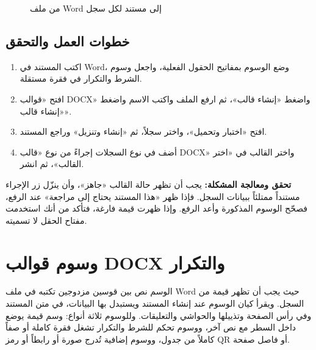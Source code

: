 \begin{figure}[H]
\centering
{}
\rclegend
\caption{من ملف Word إلى مستند لكل سجل}
\label{fig:builder-docx-flow}
\end{figure}

\subsection{خطوات العمل والتحقق}
\begin{enumerate}
\item اكتب المستند في Word، وضع الوسوم بمفاتيح الحقول الفعلية، واجعل وسوم الشرط والتكرار في فقرة مستقلة.
\item افتح «قوالب DOCX» واضغط «إنشاء قالب»، ثم ارفع الملف واكتب الاسم واضغط «إنشاء قالب».
\item افتح «اختبار وتحميل»، واختر سجلاً، ثم «إنشاء وتنزيل» وراجع المستند.
\item أضف في نوع السجلات إجراءً من نوع «قالب DOCX» واختر القالب في «اختر القالب»، ثم انشر.
\end{enumerate}

\textbf{تحقق ومعالجة المشكلة:} يجب أن تظهر حالة القالب «جاهز»، وأن ينزّل زر الإجراء مستنداً ممتلئاً ببيانات السجل. فإذا ظهر «هذا المستند يحتاج إلى مراجعة» عند الرفع، فصحّح الوسوم المذكورة وأعد الرفع. وإذا ظهرت قيمة فارغة، فتأكد من أنك استخدمت مفتاح الحقل لا تسميته.

\clearpage
\section{وسوم قوالب DOCX والتكرار}
\label{sec:builder-feature-docx-tags}

الوسم نص بين قوسين مزدوجين تكتبه في ملف Word حيث يجب أن تظهر قيمة من السجل. ويقرأ كيان الوسوم عند إنشاء المستند ويستبدل بها البيانات، في متن المستند وفي رأس الصفحة وتذييلها والحواشي والتعليقات. وللوسوم ثلاثة أنواع: وسم قيمة يوضع داخل السطر مع نص آخر، ووسوم تحكم للشرط والتكرار تشغل فقرة كاملة أو صفاً كاملاً من جدول، ووسوم إضافية تُدرج صورة أو رابطاً أو رمز QR أو فاصل صفحة.

